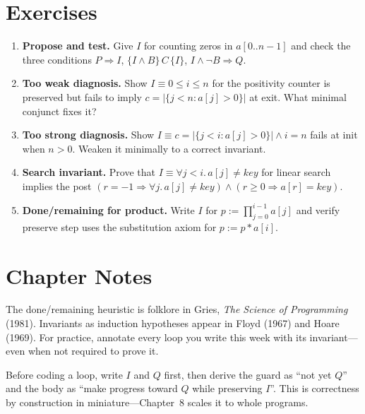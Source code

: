 \section{Exercises}
\label{sec:ch03-exercises}
\begin{enumerate}[label=E3.\arabic*, leftmargin=*, itemsep=0.6em]
    \item \textbf{Propose and test.} Give $I$ for counting zeros in $a[0..n-1]$ and check the three conditions $P\Rightarrow I$, $\{I\land B\}\,C\,\{I\}$, $I\land\neg B\Rightarrow Q$.
    \item \textbf{Too weak diagnosis.} Show $I\equiv 0\le i\le n$ for the positivity counter is preserved but fails to imply $c=|\{j<n:a[j]>0\}|$ at exit. What minimal conjunct fixes it?
    \item \textbf{Too strong diagnosis.} Show $I\equiv c=|\{j<i:a[j]>0\}|\land i=n$ fails at init when $n>0$. Weaken it minimally to a correct invariant.
    \item \textbf{Search invariant.} Prove that $I\equiv \forall j<i.\,a[j]\neq key$ for linear search implies the post $(r=-1\Rightarrow\forall j.\,a[j]\neq key)\land(r\ge0\Rightarrow a[r]=key)$.
    \item \textbf{Done/remaining for product.} Write $I$ for $p:=\prod_{j=0}^{i-1} a[j]$ and verify preserve step uses the substitution axiom for $p:=p*a[i]$.
\end{enumerate}

\section*{Chapter Notes}
The done/remaining heuristic is folklore in Gries, \emph{The Science of Programming} (1981). Invariants as induction hypotheses appear in Floyd (1967) and Hoare (1969). For practice, annotate every loop you write this week with its invariant—even when not required to prove it.

\smallskip
\begin{remark}
Before coding a loop, write $I$ and $Q$ first, then derive the guard as ``not yet $Q$'' and the body as ``make progress toward $Q$ while preserving $I$''. This is correctness by construction in miniature—Chapter~8 scales it to whole programs.
\end{remark}
